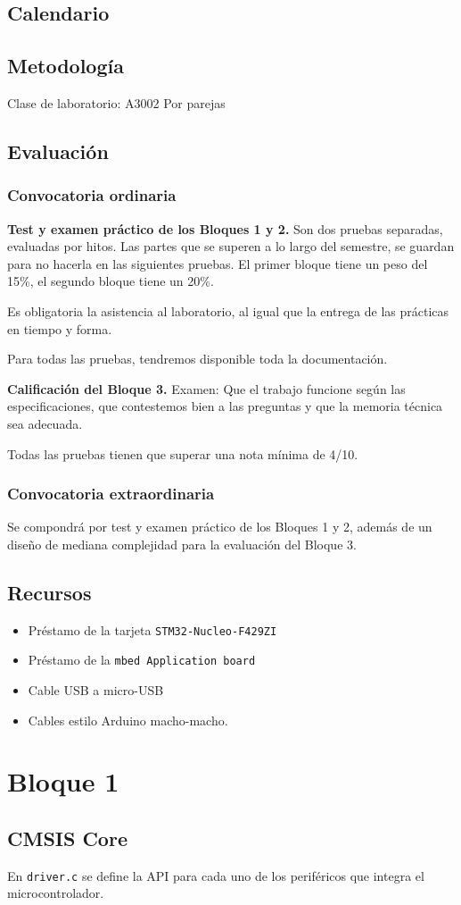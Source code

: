 \documentclass[10pt]{article}
\begin{document}
\subsection{Calendario}

\subsection{Metodología}

Clase de laboratorio: A3002
Por parejas

\subsection{Evaluación}

\subsubsection{Convocatoria ordinaria}
\textbf{Test y examen práctico de los Bloques 1 y 2.} Son dos pruebas separadas, evaluadas por hitos. Las partes que se superen a lo largo del semestre, se guardan para no hacerla en las siguientes pruebas. El primer bloque tiene un peso del 15\%, el segundo bloque tiene un 20\%.

Es obligatoria la asistencia al laboratorio, al igual que la entrega de las prácticas en tiempo y forma.

Para todas las pruebas, tendremos disponible toda la documentación.

\textbf{Calificación del Bloque 3.} Examen: Que el trabajo funcione según las especificaciones, que contestemos bien a las preguntas y que la memoria técnica sea adecuada.

Todas las pruebas tienen que superar una nota mínima de 4/10.

\subsubsection{Convocatoria extraordinaria}
Se compondrá por test y examen práctico de los Bloques 1 y 2, además de un diseño de mediana complejidad para la evaluación del Bloque 3.

\subsection{Recursos}

\begin{itemize}
  \item Préstamo de la tarjeta \verb|STM32-Nucleo-F429ZI|
  \item Préstamo de la \verb|mbed Application board|
  \item Cable USB a micro-USB
  \item Cables estilo Arduino macho-macho.
\end{itemize}

\section{Bloque 1}

\subsection{CMSIS Core}

En \verb|driver.c| se define la API para cada uno de los periféricos que integra el microcontrolador.
\end{document}
